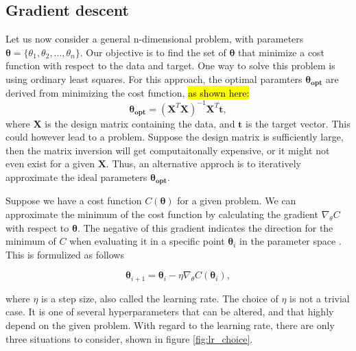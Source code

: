 \subsection*{Gradient descent}
 Let us now consider a general n-dimensional problem, with parameters $\boldsymbol{\theta} = \{\theta_1, \theta_2, ..., \theta_n\}$. 
Our objective is to find the set of $\boldsymbol{\theta}$ that minimize a cost function with respect to the data and target. 
One way to solve this problem is using ordinary least squares. For this approach, 
the optimal paramters $\boldsymbol{\theta_{opt}}$ are derived from minimizing the cost function, \hl{as shown here:}
\begin{equation*}
    \boldsymbol{\theta_{opt}} = (\boldsymbol{X}^T\boldsymbol{X})^{-1}\boldsymbol{X}^T\boldsymbol{t},
\end{equation*}
where $\boldsymbol{X}$ is the design matrix containing the data, and $\boldsymbol{t}$ is the target vector. This could however lead to a problem. 
Suppose the design matrix is sufficiently large, then the matrix inversion will get 
computaitonally expensive, or it might not even exist for a given $\boldsymbol{X}$. 
Thus, an alternative approch is to iteratively approximate the ideal parameters $\boldsymbol{\theta_{opt}}$. \par 
Suppose we have a cost function $C(\boldsymbol{\theta})$ for a given problem. We can approximate the minimum of 
the cost function by calculating the gradient $\nabla_{\theta}C$ with respect to $\boldsymbol{\theta}$. 
The negative of this gradient indicates the direction for the minimum of $C$ when evaluating 
it in a specific point $\boldsymbol{\theta}_i$ in the parameter space \cite{FYSSTK}. This is formulized as follows 

\begin{equation}
    \boldsymbol{\theta}_{i+1} = \boldsymbol{\theta}_i - \eta\nabla_{\theta}C(\boldsymbol{\theta}_i),
\end{equation}

where $\eta$ is a step size, also called the learning rate. The choice of $\eta$ is not a trivial case. It is one of several 
hyperparameters\cite{Goodfellow-et-al-2016} that can be altered, and that highly depend on the given problem. 
With regard to the learning rate, there are only three situations to consider, shown in figure \ref{fig:lr_choice}.


